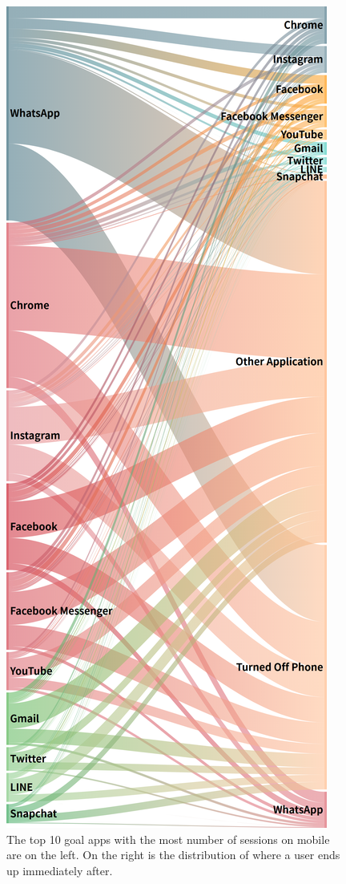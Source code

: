 \begin{figure}
\includegraphics[width=\linewidth]{figures2/android_sankey_v7.png}
\caption{
The top 10 goal apps with the most number of sessions on mobile are on the left. On the right is the distribution of where a user ends up immediately after.
}
  \label{fig:android_sankey_v2} 
\end{figure}

